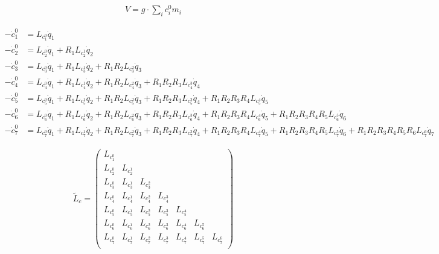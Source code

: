 {\begin{align*}
    V = g \cdot \sum_i c^0_i m_i
\end{align*}


\begin{align*}
    - \dot{c}_1^0 &= L_{c_1^0} \dot{q}_1 \\
    - \dot{c}_2^0 &= L_{c_2^0} \dot{q}_1 + R_1 L_{c_2^1} \dot{q}_2 \\
    - \dot{c}_3^0 &= L_{c_3^0} \dot{q}_1 + R_1 L_{c_3^1} \dot{q}_2 + R_1 R_2 L_{c_3^2} \dot{q}_3 \\
    - \dot{c}_4^0 &= L_{c_4^0} \dot{q}_1 + R_1 L_{c_4^1} \dot{q}_2 + R_1 R_2 L_{c_4^2} \dot{q}_3 + R_1 R_2 R_3 L_{c_4^3} \dot{q}_4 \\
    - \dot{c}_5^0 &= L_{c_5^0} \dot{q}_1 + R_1 L_{c_5^1} \dot{q}_2 + R_1 R_2 L_{c_5^2} \dot{q}_3 + R_1 R_2 R_3 L_{c_5^3} \dot{q}_4 + R_1 R_2 R_3 R_4 L_{c_5^4} \dot{q}_5 \\
    - \dot{c}_6^0 &= L_{c_6^0} \dot{q}_1 + R_1 L_{c_6^1} \dot{q}_2 + R_1 R_2 L_{c_6^2} \dot{q}_3 + R_1 R_2 R_3 L_{c_6^3} \dot{q}_4 + R_1 R_2 R_3 R_4 L_{c_6^4} \dot{q}_5 + R_1 R_2 R_3 R_4 R_5 L_{c_6^5} \dot{q}_6 \\
    - \dot{c}_7^0 &= L_{c_7^0} \dot{q}_1 + R_1 L_{c_7^1} \dot{q}_2 + R_1 R_2 L_{c_7^2} \dot{q}_3 + R_1 R_2 R_3 L_{c_7^3} \dot{q}_4 + R_1 R_2 R_3 R_4 L_{c_7^4} \dot{q}_5 + R_1 R_2 R_3 R_4 R_5 L_{c_7^5} \dot{q}_6 + R_1 R_2 R_3 R_4 R_5 R_6 L_{c_7^6} \dot{q}_7
\end{align*}

\begin{align*}
    \tilde{L}_c =
    \begin{pmatrix}
        L_{c_1^0} &           &           &           &           &           &           \\
        L_{c_2^0} & L_{c_2^1} &           &           &           &           &           \\
        L_{c_3^0} & L_{c_3^1} & L_{c_3^2} &           &           &           &           \\
        L_{c_4^0} & L_{c_4^1} & L_{c_4^2} & L_{c_4^3} &           &           &           \\
        L_{c_5^0} & L_{c_5^1} & L_{c_5^2} & L_{c_5^3} & L_{c_5^4} &           &           \\
        L_{c_6^0} & L_{c_6^1} & L_{c_6^2} & L_{c_6^3} & L_{c_6^4} & L_{c_6^5} &           \\
        L_{c_7^0} & L_{c_7^1} & L_{c_7^2} & L_{c_7^3} & L_{c_7^4} & L_{c_7^5} & L_{c_7^6} \\
    \end{pmatrix}
\end{align*}


}
